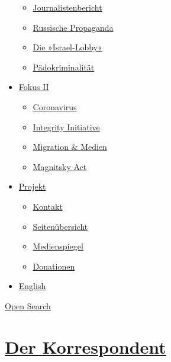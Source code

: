 \begin{itemize}
  \begin{itemize}
  \tightlist
  \item
    \href{https://swprs.org/bericht-eines-journalisten/}{Journalistenbericht}
  \item
    \href{https://swprs.org/russische-propaganda/}{Russische Propaganda}
  \item
    \href{https://swprs.org/die-israel-lobby-fakten-und-mythen/}{Die
    »Israel-Lobby«}
  \item
    \href{https://swprs.org/geopolitik-und-paedokriminalitaet/}{Pädokriminalität}
  \end{itemize}
\item
  \href{https://swprs.org/migration-und-medien/}{Fokus II}

  \begin{itemize}
  \tightlist
  \item
    \href{https://swprs.org/covid-19-hinweis-ii/}{Coronavirus}
  \item
    \href{https://swprs.org/die-integrity-initiative/}{Integrity
    Initiative}
  \item
    \href{https://swprs.org/migration-und-medien/}{Migration \& Medien}
  \item
    \href{https://swprs.org/der-fall-magnitsky/}{Magnitsky Act}
  \end{itemize}
\item
  \href{https://swprs.org/kontakt/}{Projekt}

  \begin{itemize}
  \tightlist
  \item
    \href{https://swprs.org/kontakt/}{Kontakt}
  \item
    \href{https://swprs.org/uebersicht/}{Seitenübersicht}
  \item
    \href{https://swprs.org/medienspiegel/}{Medienspiegel}
  \item
    \href{https://swprs.org/donationen/}{Donationen}
  \end{itemize}
\item
  \href{https://swprs.org/contact/}{English}
\end{itemize}

\protect\hyperlink{}{Open Search}

\hypertarget{der-korrespondent}{%
\section{\texorpdfstring{\href{https://swprs.org/2017/03/01/der-korrespondent/}{Der
Korrespondent}}{Der Korrespondent}}\label{der-korrespondent}}

